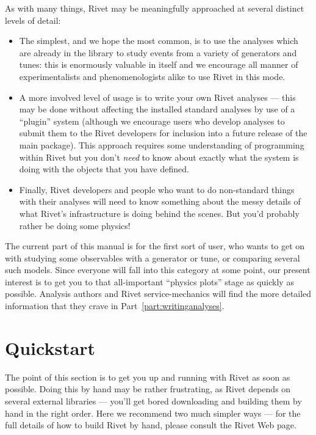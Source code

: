 As with many things, Rivet may be meaningfully approached at several distinct
levels of detail:

\begin{itemize}
\item The simplest, and we hope the most common, is to use the analyses which
  are already in the library to study events from a variety of generators and
  tunes: this is enormously valuable in itself and we encourage all manner of
  experimentalists and phenomenologists alike to use Rivet in this mode.
\item A more involved level of usage is to write your own Rivet analyses ---
  this may be done without affecting the installed standard analyses by use of a
  ``plugin'' system (although we encourage users who develop analyses to submit
  them to the Rivet developers for inclusion into a future release of the main
  package). This approach requires some understanding of programming within
  Rivet but you don't \emph{need} to know about exactly what the system is doing
  with the objects that you have defined.
\item Finally, Rivet developers and people who want to do non-standard things
  with their analyses will need to know something about the messy details of
  what Rivet's infrastructure is doing behind the scenes. But you'd probably
  rather be doing some physics!
\end{itemize}

The current part of this manual is for the first sort of user, who wants to get
on with studying some observables with a generator or tune, or comparing several
such models. Since everyone will fall into this category at some point, our
present interest is to get you to that all-important ``physics plots'' stage as
quickly as possible. Analysis authors and Rivet service-mechanics will find the
more detailed information that they crave in Part~\ref{part:writinganalyses}.


\section{Quickstart}

The point of this section is to get you up and running with Rivet as soon as
possible. Doing this by hand may be rather frustrating, as Rivet depends on
several external libraries --- you'll get bored downloading and building them by
hand in the right order. Here we recommend two much simpler ways --- for the
full details of how to build Rivet by hand, please consult the Rivet Web page.


